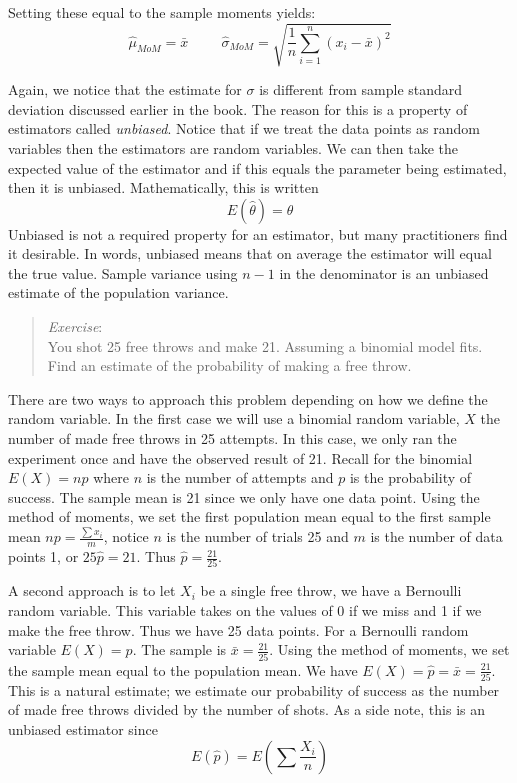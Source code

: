 \documentclass[
  letterpaper,
  DIV=11,
  numbers=noendperiod]{scrreprt}
\begin{document}
Setting these equal to the sample moments yields: \[
\hat{\mu}_{MoM}=\bar{x} \hspace{1cm} \hat{\sigma}_{MoM} = \sqrt{\frac{1}{n}\sum_{i=1}^n (x_i-\bar{x})^2}
\]

Again, we notice that the estimate for \(\sigma\) is different from
sample standard deviation discussed earlier in the book. The reason for
this is a property of estimators called \emph{unbiased}. Notice that if
we treat the data points as random variables then the estimators are
random variables. We can then take the expected value of the estimator
and if this equals the parameter being estimated, then it is unbiased.
Mathematically, this is written \[
E(\hat{\theta})=\theta
\] Unbiased is not a required property for an estimator, but many
practitioners find it desirable. In words, unbiased means that on
average the estimator will equal the true value. Sample variance using
\(n-1\) in the denominator is an unbiased estimate of the population
variance.

\begin{quote}
\emph{Exercise}:\\
You shot 25 free throws and make 21. Assuming a binomial model fits.
Find an estimate of the probability of making a free throw.
\end{quote}

There are two ways to approach this problem depending on how we define
the random variable. In the first case we will use a binomial random
variable, \(X\) the number of made free throws in 25 attempts. In this
case, we only ran the experiment once and have the observed result of
21. Recall for the binomial \(E(X)=np\) where \(n\) is the number of
attempts and \(p\) is the probability of success. The sample mean is 21
since we only have one data point. Using the method of moments, we set
the first population mean equal to the first sample mean
\(np=\frac{\sum{x_i}}{m}\), notice \(n\) is the number of trials 25 and
\(m\) is the number of data points 1, or \(25 \hat{p} = 21\). Thus
\(\hat{p} = \frac{21}{25}\).

A second approach is to let \(X_i\) be a single free throw, we have a
Bernoulli random variable. This variable takes on the values of 0 if we
miss and 1 if we make the free throw. Thus we have 25 data points. For a
Bernoulli random variable \(E(X)=p\). The sample is
\(\bar{x} = \frac{21}{25}\). Using the method of moments, we set the
sample mean equal to the population mean. We have
\(E(X) = \hat{p} = \bar{x} = \frac{21}{25}\). This is a natural
estimate; we estimate our probability of success as the number of made
free throws divided by the number of shots. As a side note, this is an
unbiased estimator since \[
E(\hat{p})=E\left( \sum{\frac{X_i}{n}} \right)
\]
\end{document}
